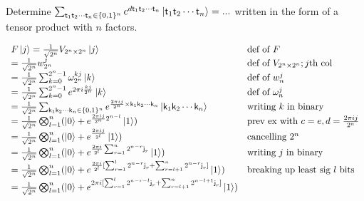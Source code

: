 

\begin{example}
Determine $\sum_{\textsf{t}_1 \textsf{t}_2 \dotsm \textsf{t}_n \in \{0,1\}^n} 
c^{d \textsf{t}_1 \textsf{t}_2 \dotsm \textsf{t}_n} 
\left|\textsf{t}_1 \textsf{t}_2 \dotsm \textsf{t}_n\right\rangle = ...$ 
written in the form of a tensor product with $n$ factors.
\end{example}



\frmrule

\[ 
\begin{array}{ll}
F\left|j\right\rangle = \frac{1}{\sqrt{2^n}} V_{2^n \times 2^n} \left|j\right\rangle & \text{def of } F  \\
         = \frac{1}{\sqrt{2^n}} w^{j}_{2^n} & \text{def of } V_{2^n \times 2^n}; j\text{th col} \\
         = \frac{1}{\sqrt{2^n}} \sum^{2^n-1}_{k=0} \omega^{kj}_{2^n} \left|k\right\rangle & \text{def of } w^{j}_{n}\\
         = \frac{1}{\sqrt{2^n}} \sum^{2^n-1}_{k=0} e^{2\pi i\frac{kj}{2^n}} \left|k\right\rangle & \text{def of } \omega^{j}_{n} \\
         = \frac{1}{\sqrt{2^n}} \sum_{\textsf{k}_1 \textsf{k}_2 \dotsm \textsf{k}_n \in \{0,1\}^n} 
                   e^{\frac{2 \pi ij}{2^n} \times \textsf{k}_1 \textsf{k}_2 \dotsm \textsf{k}_n} 
                   \left|\textsf{k}_1 \textsf{k}_2 \dotsm \textsf{k}_n\right\rangle & \text{writing }k\text{ in binary} \\
		= \frac{1}{\sqrt{2^n}} \bigotimes^n_{l=1} (\left|0\right\rangle + e^{\frac{2\pi i j}{2^n} 2^{n-l}} \left|1\right\rangle)
		& \text{prev ex with } c = e, d = \frac{2\pi i j}{2^n} \\
		= \frac{1}{\sqrt{2^n}} \bigotimes^n_{l=1} (\left|0\right\rangle + e^{\frac{2\pi i j}{2^l}} \left|1\right\rangle)
		 & \text{cancelling }2^n \\
		= \frac{1}{\sqrt{2^n}} \bigotimes^n_{l=1} (\left|0\right\rangle + e^{\frac{2\pi i}{2^l} \sum^{n}_{r=1} 2^{n-r}
         \textsf{j}_r} \left|1\right\rangle) & \text{writing }j\text{ in binary} \\
		= \frac{1}{\sqrt{2^n}} \bigotimes^n_{l=1} (\left|0\right\rangle + e^{\frac{2\pi i}{2^l} 
		[\sum^{l}_{r=1} 2^{n-r} \textsf{j}_r + \sum^{n}_{r=l+1} 2^{n-r} \textsf{j}_r]}  \left|1\right\rangle) & 
		\text{breaking up least sig } l \text{ bits} \\
		= \frac{1}{\sqrt{2^n}} \bigotimes^n_{l=1} (\left|0\right\rangle + e^{2\pi i
		[\sum^{l}_{r=1} 2^{n-r-l} \textsf{j}_r + \sum^{n}_{r=l+1} 2^{n-l+1} \textsf{j}_r]}  \left|1\right\rangle) & 

\end{array}\]
